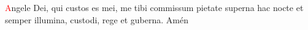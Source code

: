 \textcolor{red}{A}ngele Dei, qui custos es mei, me tibi commissum pietate superna hac nocte et semper illumina, custodi, rege et guberna. Amén